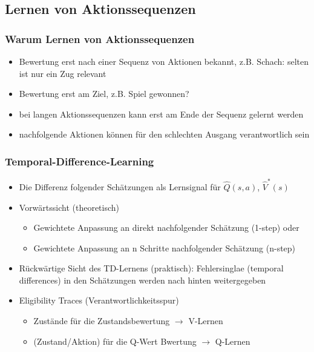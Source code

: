 \documentclass[paper=a4, fontsize=11pt]{scrartcl} %
\numberwithin{equation}{section} %
\numberwithin{figure}{section} %
\numberwithin{table}{section} %
\begin{document}
\subsection{Lernen von Aktionssequenzen}

\subsubsection{Warum Lernen von Aktionssequenzen}

\begin{itemize}
\item Bewertung erst nach einer Sequenz von Aktionen bekannt, z.B. Schach: selten ist nur ein Zug relevant
\item Bewertung erst am Ziel, z.B. Spiel gewonnen?
\item bei langen Aktionssequenzen kann erst am Ende der Sequenz gelernt werden
\item nachfolgende Aktionen können für den schlechten Ausgang verantwortlich sein
\end{itemize}

\subsubsection{Temporal-Difference-Learning}

\begin{itemize}
\item Die Differenz folgender Schätzungen als Lernsignal für $\hat{Q}(s,a)$, $\hat{V}^*(s)$
\item Vorwärtssicht (theoretisch)
\begin{itemize}
\item Gewichtete Anpassung an direkt nachfolgender Schätzung (1-step) oder
\item Gewichtete Anpassung an n Schritte nachfolgender Schätzung (n-step)
\end{itemize}
\item Rückwärtige Sicht des TD-Lernens (praktisch): Fehlersinglae (temporal differences) in den Schätzungen werden nach hinten weitergegeben
\item Eligibility Traces (Verantwortlichkeitsspur)
\begin{itemize}
\item Zustände für die Zustandsbewertung $\rightarrow$ V-Lernen
\item (Zustand/Aktion) für die Q-Wert Bwertung $\rightarrow$ Q-Lernen
\end{itemize}
\end{itemize}
\end{document}
